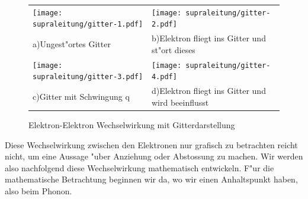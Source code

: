 \begin{refsection}
\begin{figure}
\centering
  \begin{tabular}{l l}
  \centering
    \begin{minipage}{0.48\textwidth}
	\texttt{[image: supraleitung/gitter-1.pdf]}
    \end{minipage}
    &
    \begin{minipage}{0.48\textwidth}
	\texttt{[image: supraleitung/gitter-2.pdf]}	
    \end{minipage}
    \\
    a)\quad Ungest"ortes Gitter
    &
    b)\quad Elektron fliegt ins Gitter und st"ort dieses
    \\
    \begin{minipage}{0.48\textwidth}
	\texttt{[image: supraleitung/gitter-3.pdf]}
    \end{minipage}
    &
    \begin{minipage}{0.48\textwidth}
	\texttt{[image: supraleitung/gitter-4.pdf]}
    \end{minipage}
    \\
    c)\quad Gitter mit Schwingung q
    &
    d)\quad Elektron fliegt ins Gitter und wird beeinflusst
    \\
  \end{tabular}
  \caption{Elektron-Elektron Wechselwirkung mit Gitterdarstellung
  \label{supraleitung:Gitter}}
\end{figure}

Diese Wechselwirkung zwischen den Elektronen nur grafisch zu betrachten reicht nicht,
um eine Aussage "uber Anziehung oder Abstossung zu machen.
Wir werden also nachfolgend diese Wechselwirkung mathematisch entwickeln.
F"ur die mathematische Betrachtung beginnen wir da, wo wir einen Anhaltspunkt haben, also beim Phonon.


\end{refsection}
